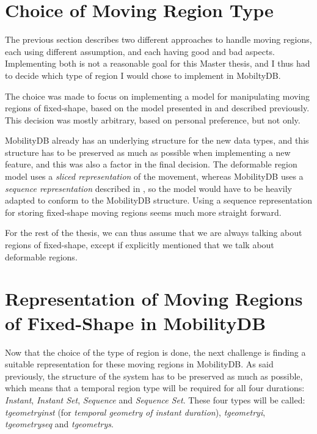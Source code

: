\section{Choice of Moving Region Type}

The previous section describes two different approaches to handle moving regions, each using different assumption, and each having good and bad aspects. Implementing both is not a reasonable goal for this Master thesis, and I thus had to decide which type of region I would chose to implement in MobiltyDB.

The choice was made to focus on implementing a model for manipulating moving regions of fixed-shape, based on the model presented in  and described previously. This decision was mostly arbitrary, based on personal preference, but not only. 

MobilityDB already has an underlying structure for the new data types, and this structure has to be preserved as much as possible when implementing a new feature, and this was also a factor in the final decision. The deformable region model uses a \textit{sliced representation} of the movement, whereas MobilityDB uses a \textit{sequence representation} described in , so the model would have to be heavily adapted to conform to the MobilityDB structure. Using a sequence representation for storing fixed-shape moving regions seems much more straight forward.

For the rest of the thesis, we can thus assume that we are always talking about regions of fixed-shape, except if explicitly mentioned that we talk about deformable regions.

\section{Representation of Moving Regions of Fixed-Shape in MobilityDB}

Now that the choice of the type of region is done, the next challenge is finding a suitable representation for these moving regions in MobilityDB. As said previously, the structure of the system has to be preserved as much as possible, which means that a temporal region type will be required for all four durations: \textit{Instant}, \textit{Instant Set}, \textit{Sequence} and \textit{Sequence Set}. These four types will be called: \textit{tgeometryinst} (for \textit{temporal geometry of instant duration}), \textit{tgeometryi}, \textit{tgeometryseq} and \textit{tgeometrys}.



